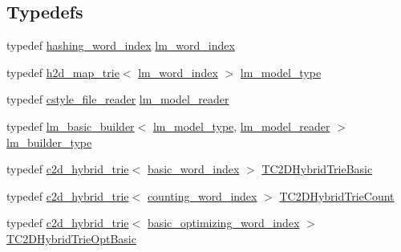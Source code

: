 \subsection*{Typedefs}
\begin{DoxyCompactItemize}
\item 
typedef \hyperlink{classuva_1_1smt_1_1bpbd_1_1server_1_1lm_1_1dictionary_1_1hashing__word__index}{hashing\+\_\+word\+\_\+index} \hyperlink{namespaceuva_1_1smt_1_1bpbd_1_1server_1_1lm_a023e38a6fe02511f8c3c806784c2a5f2}{lm\+\_\+word\+\_\+index}
\item 
typedef \hyperlink{classuva_1_1smt_1_1bpbd_1_1server_1_1lm_1_1h2d__map__trie}{h2d\+\_\+map\+\_\+trie}$<$ \hyperlink{namespaceuva_1_1smt_1_1bpbd_1_1server_1_1lm_a023e38a6fe02511f8c3c806784c2a5f2}{lm\+\_\+word\+\_\+index} $>$ \hyperlink{namespaceuva_1_1smt_1_1bpbd_1_1server_1_1lm_aca89ac213c9f12240dbf6ac0953bd75f}{lm\+\_\+model\+\_\+type}
\item 
typedef \hyperlink{classuva_1_1utils_1_1file_1_1cstyle__file__reader}{cstyle\+\_\+file\+\_\+reader} \hyperlink{namespaceuva_1_1smt_1_1bpbd_1_1server_1_1lm_a547d3f566b0e505cae1c65a9ce6c9a64}{lm\+\_\+model\+\_\+reader}
\item 
typedef \hyperlink{classuva_1_1smt_1_1bpbd_1_1server_1_1lm_1_1arpa_1_1lm__basic__builder}{lm\+\_\+basic\+\_\+builder}$<$ \hyperlink{namespaceuva_1_1smt_1_1bpbd_1_1server_1_1lm_aca89ac213c9f12240dbf6ac0953bd75f}{lm\+\_\+model\+\_\+type}, \hyperlink{namespaceuva_1_1smt_1_1bpbd_1_1server_1_1lm_a547d3f566b0e505cae1c65a9ce6c9a64}{lm\+\_\+model\+\_\+reader} $>$ \hyperlink{namespaceuva_1_1smt_1_1bpbd_1_1server_1_1lm_a145b3eb02a2cb53bc18b70909aba742f}{lm\+\_\+builder\+\_\+type}
\item 
typedef \hyperlink{classuva_1_1smt_1_1bpbd_1_1server_1_1lm_1_1c2d__hybrid__trie}{c2d\+\_\+hybrid\+\_\+trie}$<$ \hyperlink{classuva_1_1smt_1_1bpbd_1_1server_1_1lm_1_1dictionary_1_1basic__word__index}{basic\+\_\+word\+\_\+index} $>$ \hyperlink{namespaceuva_1_1smt_1_1bpbd_1_1server_1_1lm_aa8635ba03284cbec1c3c4624be585843}{T\+C2\+D\+Hybrid\+Trie\+Basic}
\item 
typedef \hyperlink{classuva_1_1smt_1_1bpbd_1_1server_1_1lm_1_1c2d__hybrid__trie}{c2d\+\_\+hybrid\+\_\+trie}$<$ \hyperlink{classuva_1_1smt_1_1bpbd_1_1server_1_1lm_1_1dictionary_1_1counting__word__index}{counting\+\_\+word\+\_\+index} $>$ \hyperlink{namespaceuva_1_1smt_1_1bpbd_1_1server_1_1lm_a3ec9e9d13b9d4113be8a17daff17f9fe}{T\+C2\+D\+Hybrid\+Trie\+Count}
\item 
typedef \hyperlink{classuva_1_1smt_1_1bpbd_1_1server_1_1lm_1_1c2d__hybrid__trie}{c2d\+\_\+hybrid\+\_\+trie}$<$ \hyperlink{namespaceuva_1_1smt_1_1bpbd_1_1server_1_1lm_1_1dictionary_a3001583c904eec702b4a4125082a7ecd}{basic\+\_\+optimizing\+\_\+word\+\_\+index} $>$ \hyperlink{namespaceuva_1_1smt_1_1bpbd_1_1server_1_1lm_abffc9eb1eef6c2764ec48dc9044f2519}{T\+C2\+D\+Hybrid\+Trie\+Opt\+Basic}

\end{DoxyCompactItemize}
